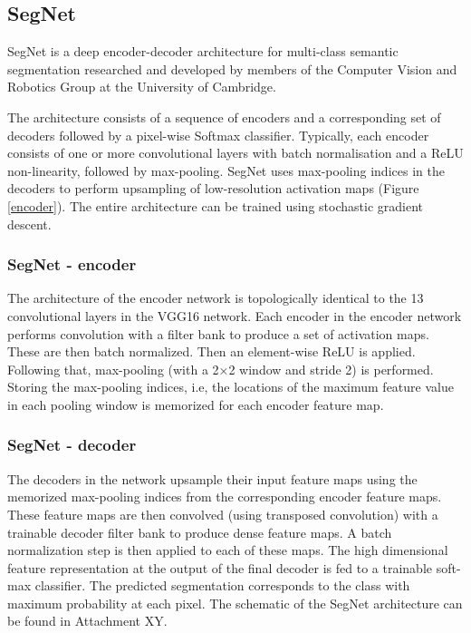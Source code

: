 \newpage
\subsection{SegNet}

SegNet is a deep encoder-decoder architecture for multi-class semantic segmentation researched and developed by members of the Computer Vision and Robotics Group at the University of Cambridge. \cite{segnet_tut}

The architecture consists of a sequence of encoders and a corresponding set of decoders followed by a pixel-wise Softmax classifier. Typically, each encoder consists of one or more convolutional layers with batch normalisation and a ReLU non-linearity, followed by max-pooling. SegNet uses max-pooling indices in the decoders to perform upsampling of low-resolution activation maps (Figure \ref{encoder}). The entire architecture can be trained using stochastic gradient descent. \cite{segnet_tut}

\subsubsection{SegNet - encoder}

The architecture of the encoder network is topologically identical to the 13 convolutional layers in the VGG16 network. Each encoder in the encoder network performs convolution with a filter bank to produce a set of activation maps. These are then batch normalized. Then an element-wise ReLU is applied. Following that, max-pooling (with a 2×2 window and stride 2) is performed. Storing the max-pooling indices, i.e, the locations of the maximum feature value in each pooling window is memorized for each encoder feature map. \cite{segnet}

\subsubsection{SegNet - decoder}

The decoders in the network upsample their input feature maps using the memorized max-pooling indices from the corresponding encoder feature maps. These feature maps are then convolved (using transposed convolution) with a trainable decoder filter bank to produce dense feature maps. A batch normalization step is then applied to each of these maps. The high dimensional feature representation at the output of the final decoder is fed to a trainable soft-max classifier. The predicted segmentation corresponds to the class with maximum probability at each pixel. \cite{segnet} The schematic of the SegNet architecture can be found in Attachment XY.

